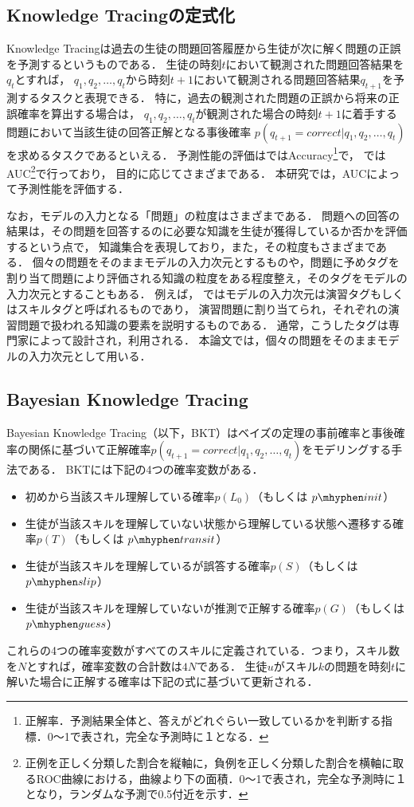 \subsection{Knowledge Tracingの定式化}
Knowledge Tracingは過去の生徒の問題回答履歴から生徒が次に解く問題の正誤を予測するというものである．
生徒の時刻$t$において観測された問題回答結果を$q_{t}$とすれば，
$q_1, q_2, \dots, q_t$から時刻$t+1$において観測される問題回答結果$q_{t+1}$を予測するタスクと表現できる．
特に，過去の観測された問題の正誤から将来の正誤確率を算出する場合は，
$q_1, q_2, \dots, q_t$が観測された場合の時刻$t+1$に着手する問題において当該生徒の回答正解となる事後確率
$p(q_{t+1} = correct|q_1, q_2, \dots, q_t)$を求めるタスクであるといえる．
予測性能の評価は\cite{yudelson2013individualized, falakmasir2015spectral}ではAccuracy\footnote{正解率．予測結果全体と、答えがどれぐらい一致しているかを判断する指標．0〜1で表され，完全な予測時に１となる．}で，
\cite{piech2015deep}ではAUC\footnote{正例を正しく分類した割合を縦軸に，負例を正しく分類した割合を横軸に取るROC曲線における，曲線より下の面積．0〜1で表され，完全な予測時に１となり，ランダムな予測で0.5付近を示す．}で行っており，
目的に応じてさまざまである．
本研究では，AUCによって予測性能を評価する．


なお，モデルの入力となる「問題」の粒度はさまざまである．
問題への回答の結果は，その問題を回答するのに必要な知識を生徒が獲得しているか否かを評価するという点で，
知識集合を表現しており，また，その粒度もさまざまである．
個々の問題をそのままモデルの入力次元とするものや，問題に予めタグを割り当て問題により評価される知識の粒度をある程度整え，そのタグをモデルの入力次元とすることもある．
例えば，
\cite{piech2015deep}ではモデルの入力次元は演習タグもしくはスキルタグと呼ばれるものであり，
演習問題に割り当てられ，それぞれの演習問題で扱われる知識の要素を説明するものである．
通常，こうしたタグは専門家によって設計され，利用される．
本論文では，個々の問題をそのままモデルの入力次元として用いる．


\subsection{Bayesian Knowledge Tracing}
Bayesian Knowledge Tracing\cite{corbett1994knowledge}（以下，BKT）はベイズの定理の事前確率と事後確率の関係に基づいて正解確率$p(q_{t+1} = correct|q_1, q_2, \dots, q_t)$をモデリングする手法である．
BKTには下記の4つの確率変数がある．
\begin{itemize}
\item 初めから当該スキル理解している確率$p(L_0)$（もしくは $p\mhyphen init$）
\item 生徒が当該スキルを理解していない状態から理解している状態へ遷移する確率$p(T)$（もしくは $p\mhyphen transit$）
\item 生徒が当該スキルを理解しているが誤答する確率$p(S)$（もしくは $p\mhyphen slip$）
\item 生徒が当該スキルを理解していないが推測で正解する確率$p(G)$（もしくは $p\mhyphen guess$）
\end{itemize}
これらの4つの確率変数がすべてのスキルに定義されている．つまり，スキル数を$N$とすれば，確率変数の合計数は$4N$である．
生徒$u$がスキル$k$の問題を時刻$t$に解いた場合に正解する確率は下記の式に基づいて更新される．

